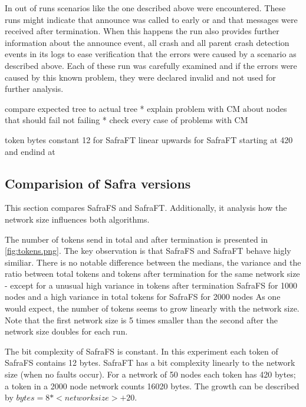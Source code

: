 In %
out of %
runs scenarios like the one described above were encountered. 
These runs might indicate that announce was called to early or and that messages were received after termination.
When this happens the run also provides further information about the announce event, all crash and all parent crash detection events in its logs to ease verification that the errors were caused by a scenario as described above.
Each of these run was carefully examined and if the errors were caused by this known problem, they were declared invalid and not used for further analysis.

compare expected tree to actual tree
* explain problem with CM about nodes that should fail not failing
* check every case of problems with CM

token bytes constant 12 for SafraFT linear upwards for SafraFT starting at 420 and endind at 

\subsection{Comparision of Safra versions}
This section compares SafraFS and SafraFT. 
Additionally, it analysis how the network size influences both algorithms.

The number of tokens send in total and after termination is presented in \cref{fig:tokens.png}.
The key observation is that SafraFS and SafraFT behave higly similiar.
There is no notable difference between the medians, the variance and the ratio between total tokens and tokens after termination for the same network size - except for a unusual high variance in tokens after termination SafraFS for 1000 nodes and a high variance in total tokens for SafraFS for 2000 nodes %
As one would expect, the number of tokens seems to grow linearly with the network size.
Note that the first network size is 5 times smaller than the second after the network size doubles for each run.

The bit complexity of SafraFS is constant.
In this experiment each token of SafraFS contains 12 bytes.
SafraFT has a bit complexity linearly to the network size (when no faults occur).
For a network of 50 nodes each token has 420 bytes; a token in a 2000 node network counts 16020 bytes.
The growth can be described by $bytes = 8 * <network size> + 20$.

